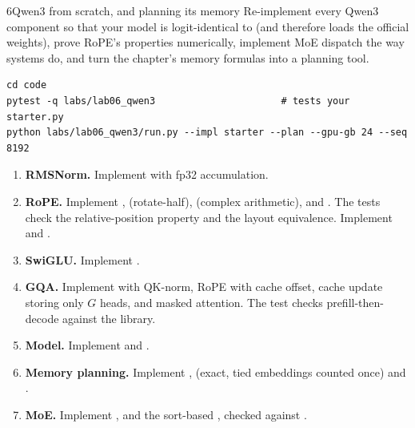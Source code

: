 \begin{labbox}{6}{Qwen3 from scratch, and planning its memory}
Re-implement every Qwen3 component so that your model is logit-identical to 
(and therefore loads the official weights), prove RoPE's properties numerically, implement MoE dispatch the
way systems do, and turn the chapter's memory formulas into a planning tool.

\begin{lstlisting}[style=shell]
cd code
pytest -q labs/lab06_qwen3                      # tests your starter.py
python labs/lab06_qwen3/run.py --impl starter --plan --gpu-gb 24 --seq 8192
\end{lstlisting}

\begin{enumerate}
\item \textbf{RMSNorm.} Implement  with fp32 accumulation.
\item \textbf{RoPE.} Implement ,  (rotate-half),
   (complex arithmetic), and .
  The tests check the relative-position property and the layout equivalence. Implement
   and .
\item \textbf{SwiGLU.} Implement .
\item \textbf{GQA.} Implement  with QK-norm, RoPE with cache offset,
  cache update storing only $G$ heads, and masked attention. The test checks prefill-then-decode against
  the library.
\item \textbf{Model.} Implement  and .
\item \textbf{Memory planning.} Implement ,  (exact, tied
  embeddings counted once) and .
\item \textbf{MoE.} Implement ,  and the sort-based
  , checked against .
\end{enumerate}


\end{labbox}
